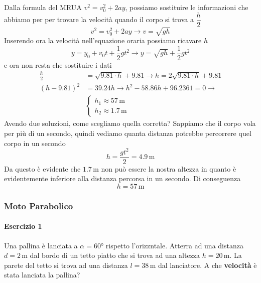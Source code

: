 Dalla formula del MRUA $v^2 = v_0^2 + 2ay$, possiamo sostituire le informazioni che abbiamo per per
trovare la velocità quando il corpo si trova a $\dfrac{h}{2}$
\begin{equation*}
  v^2 = v_0^2 + 2ay \rightarrow v = \sqrt{gh}
\end{equation*}
Inserendo ora la velocità nell'equazione oraria possiamo ricavare $h$
\begin{equation*}
  y = y_0 + v_0t + \frac{1}{2}gt^2 \rightarrow y = \sqrt{gh} + \frac{1}{2}gt^2
\end{equation*}
e ora non resta che sostituire i dati
\begin{align*}
  \frac{h}{2} &= \sqrt{9.81\cdot h} + 9.81 \rightarrow h = 2\sqrt{9.81\cdot h} + 9.81\\
  (h-9.81)^2 &= 39.24h \rightarrow h^2 -58.86h + 96.2361 = 0 \rightarrow\\
             &\begin{cases}
  h_1 \approx 57\,\text{m}\\
  h_2 \approx 1.7\,\text{m}
\end{cases}
\end{align*}
Avendo due soluzioni, come scegliamo quella corretta? Sappiamo che il corpo vola per più di un 
secondo, quindi vediamo quanta distanza potrebbe percorrere quel corpo in un secondo
\begin{equation*}
  h = \frac{gt^2}{2} = 4.9\,\text{m}
\end{equation*}
Da questo è evidente che $1.7\,\text{m}$ non può essere la nostra altezza in quanto è evidentemente 
inferiore alla distanza percorsa in un secondo. Di conseguenza
\begin{equation*}
  \boxed{h = 57\,\text{m}}
\end{equation*}

\subsubsection*{\hyperref[subsec:cinematica:mp]{Moto Parabolico}}\label{ex:mp}
\paragraph{Esercizio 1}
Una pallina è lanciata a $\alpha = \ang{60}$ rispetto l'orizzntale. Atterra ad una distanza 
$d=2\,\text{m}$ dal bordo di un tetto piatto che si trova ad una altezza $h = 20\,\text{m}$. La parete
del tetto si trova ad una distanza $l=38\,\text{m}$ dal lanciatore. A che \textbf{velocità} è stata
lanciata la pallina?

